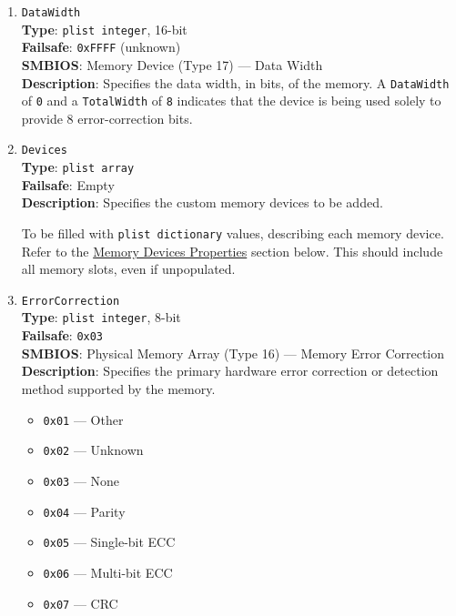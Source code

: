 \documentclass[]{article}
\providecommand{\tightlist}{%
  \setlength{\itemsep}{0pt}\setlength{\parskip}{0pt}}
\begin{document}
\begin{enumerate}

\item
  \texttt{DataWidth}\\
  \textbf{Type}: \texttt{plist\ integer}, 16-bit\\
  \textbf{Failsafe}: \texttt{0xFFFF} (unknown)\\
  \textbf{SMBIOS}: Memory Device (Type 17) --- Data Width\\
  \textbf{Description}: Specifies the data width, in bits, of the
  memory. A \texttt{DataWidth} of \texttt{0} and a \texttt{TotalWidth} of \texttt{8}
  indicates that the device is being used solely to provide 8
  error-correction bits.

\item
  \texttt{Devices}\\
  \textbf{Type}: \texttt{plist\ array}\\
  \textbf{Failsafe}: Empty\\
  \textbf{Description}: Specifies the custom memory devices to be added.

  To be filled with \texttt{plist\ dictionary} values, describing each
  memory device. Refer to the \hyperref[platforminfomemorydevice]{Memory Devices Properties}
  section below. This should include all memory slots, even if unpopulated.

\item
  \texttt{ErrorCorrection}\\
  \textbf{Type}: \texttt{plist\ integer}, 8-bit\\
  \textbf{Failsafe}: \texttt{0x03}\\
  \textbf{SMBIOS}: Physical Memory Array (Type 16) --- Memory Error Correction\\
  \textbf{Description}: Specifies the primary hardware error correction or
  detection method supported by the memory.

  \begin{itemize}
  \tightlist
  \item
    \texttt{0x01} --- Other
  \item
    \texttt{0x02} --- Unknown
  \item
    \texttt{0x03} --- None
  \item
    \texttt{0x04} --- Parity
  \item
    \texttt{0x05} --- Single-bit ECC
  \item
    \texttt{0x06} --- Multi-bit ECC
  \item
    \texttt{0x07} --- CRC
  \end{itemize}


\end{enumerate}
\end{document}
